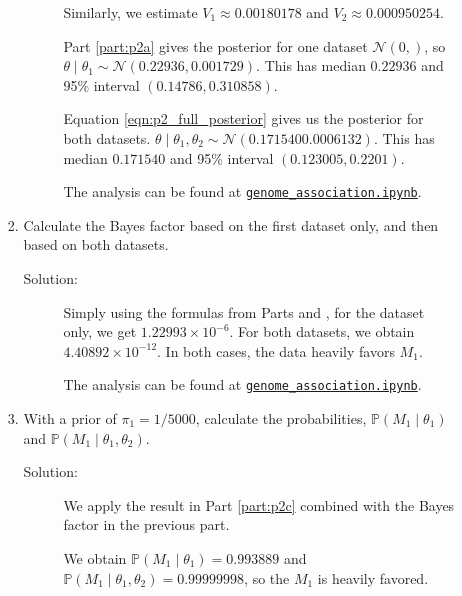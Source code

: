 \documentclass[letterpaper,11pt]{article}
\begin{document}
\begin{enumerate}
\begin{enumerate}
\begin{enumerate}
\begin{description}
        Similarly, we estimate $V_1 \approx 0.00180178$ and
        $V_2 \approx 0.000950254$.

        Part \ref{part:p2a} gives the posterior for one dataset
        $\mathcal{N}\left(0, \right)$, so
        $\theta \mid \theta_1 \sim \mathcal{N}\left(0.22936, 0.001729\right)$.
        This has median $0.22936$ and 95\% interval $(0.14786, 0.310858)$.
        
        Equation \ref{eqn:p2_full_posterior} gives us the posterior for both
        datasets.
        $\theta \mid \theta_1,\theta_2 \sim \mathcal{N}\left(0.171540
          0.0006132\right)$.  This has median $0.171540$ and 95\% interval
        $(0.123005, 0.2201)$.

        The analysis can be found at
        \href{https://nbviewer.jupyter.org/github/ppham27/stat570/blob/master/hw5/genome\_association.ipynb}{\texttt{genome\_association.ipynb}}.
      \end{description}
      
    \item Calculate the Bayes factor based on the first dataset only, and then
      based on both datasets.
      \begin{description}
      \item[Solution:] Simply using the formulas from Parts \label{part:p2b}
        and \label{part:p2e}, for the dataset only, we get
        $1.22993 \times 10^{-6}$. For both datasets, we obtain
        $4.40892 \times 10^{-12}$. In both cases, the data heavily favors $M_1$.

        The analysis can be found at
        \href{https://nbviewer.jupyter.org/github/ppham27/stat570/blob/master/hw5/genome\_association.ipynb}{\texttt{genome\_association.ipynb}}.
      \end{description}
    \item With a prior of $\pi_1 = 1/5000$, calculate the probabilities,
      $\mathbb{P}\left(M_1 \mid\theta_1\right)$ and
      $\mathbb{P}\left(M_1 \mid \theta_1, \theta_2\right)$.
      \begin{description}
      \item[Solution:] We apply the result in Part \ref{part:p2c} combined with
        the Bayes factor in the previous part.

        We obtain $\mathbb{P}\left(M_1 \mid\theta_1\right) = 0.993889$ and
        $\mathbb{P}\left(M_1 \mid\theta_1,\theta_2\right) = 0.99999998$, so the
        $M_1$ is heavily favored.


\end{description}
\end{enumerate}
\end{enumerate}
\end{enumerate}
\end{document}
